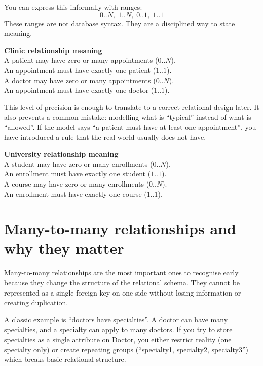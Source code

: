 You can express this informally with ranges:
\[
0..N,\; 1..N,\; 0..1,\; 1..1
\]
These ranges are not database syntax.
They are a disciplined way to state meaning.

\begin{examplebox}
\textbf{Clinic relationship meaning}\\
A patient may have zero or many appointments (\(0..N\)).\\
An appointment must have exactly one patient (\(1..1\)).\\
A doctor may have zero or many appointments (\(0..N\)).\\
An appointment must have exactly one doctor (\(1..1\)).
\end{examplebox}

This level of precision is enough to translate to a correct relational design later.
It also prevents a common mistake: modelling what is “typical” instead of what is “allowed”.
If the model says “a patient must have at least one appointment”, you have introduced a rule that the real world usually does not have.

\begin{examplebox}
\textbf{University relationship meaning}\\
A student may have zero or many enrollments (\(0..N\)).\\
An enrollment must have exactly one student (\(1..1\)).\\
A course may have zero or many enrollments (\(0..N\)).\\
An enrollment must have exactly one course (\(1..1\)).
\end{examplebox}

\section{Many-to-many relationships and why they matter}
Many-to-many relationships are the most important ones to recognise early because they change the structure of the relational schema.
They cannot be represented as a single foreign key on one side without losing information or creating duplication.

A classic example is “doctors have specialties”.
A doctor can have many specialties, and a specialty can apply to many doctors.
If you try to store specialties as a single attribute on Doctor, you either restrict reality (one specialty only) or create repeating groups (“specialty1, specialty2, specialty3”) which breaks basic relational structure.


